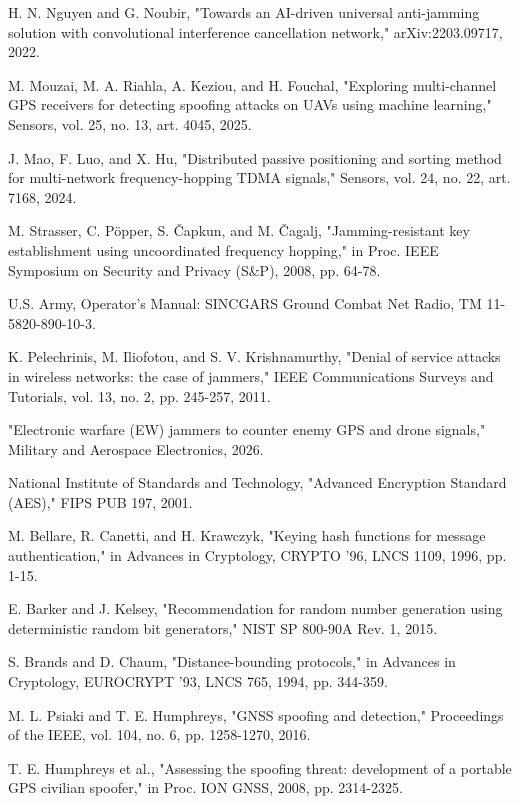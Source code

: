  H. N. Nguyen and G. Noubir, "Towards an AI-driven universal anti-jamming solution with convolutional interference cancellation network," arXiv:2203.09717, 2022.

 M. Mouzai, M. A. Riahla, A. Keziou, and H. Fouchal, "Exploring multi-channel GPS receivers for detecting spoofing attacks on UAVs using machine learning," Sensors, vol. 25, no. 13, art. 4045, 2025.

 J. Mao, F. Luo, and X. Hu, "Distributed passive positioning and sorting method for multi-network frequency-hopping TDMA signals," Sensors, vol. 24, no. 22, art. 7168, 2024.

 M. Strasser, C. Pöpper, S. \v{C}apkun, and M. \v{C}agalj, "Jamming-resistant key establishment using uncoordinated frequency hopping," in Proc. IEEE Symposium on Security and Privacy (S\&P), 2008, pp. 64-78.

 U.S. Army, Operator's Manual: SINCGARS Ground Combat Net Radio, TM 11-5820-890-10-3.

 K. Pelechrinis, M. Iliofotou, and S. V. Krishnamurthy, "Denial of service attacks in wireless networks: the case of jammers," IEEE Communications Surveys and Tutorials, vol. 13, no. 2, pp. 245-257, 2011.

 "Electronic warfare (EW) jammers to counter enemy GPS and drone signals," Military and Aerospace Electronics, 2026.

 National Institute of Standards and Technology, "Advanced Encryption Standard (AES)," FIPS PUB 197, 2001.

 M. Bellare, R. Canetti, and H. Krawczyk, "Keying hash functions for message authentication," in Advances in Cryptology, CRYPTO '96, LNCS 1109, 1996, pp. 1-15.

 E. Barker and J. Kelsey, "Recommendation for random number generation using deterministic random bit generators," NIST SP 800-90A Rev. 1, 2015.

 S. Brands and D. Chaum, "Distance-bounding protocols," in Advances in Cryptology, EUROCRYPT '93, LNCS 765, 1994, pp. 344-359.

 M. L. Psiaki and T. E. Humphreys, "GNSS spoofing and detection," Proceedings of the IEEE, vol. 104, no. 6, pp. 1258-1270, 2016.

 T. E. Humphreys et al., "Assessing the spoofing threat: development of a portable GPS civilian spoofer," in Proc. ION GNSS, 2008, pp. 2314-2325.

